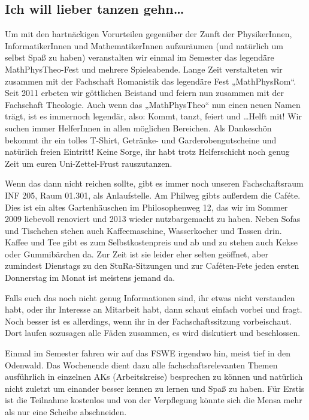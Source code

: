 \subsection*{Ich will lieber tanzen gehn\dots}
Um mit den hartnäckigen Vorurteilen gegenüber der Zunft der PhysikerInnen, InformatikerInnen und MathematikerInnen aufzuräumen (und natürlich um selbst Spaß zu haben) veranstalten wir einmal im Semester das legendäre MathPhysTheo-Fest und mehrere Spieleabende. Lange Zeit verstalteten wir zusammen mit der Fachschaft Romanistik das legendäre Fest „MathPhysRom“. Seit 2011 erbeten wir göttlichen Beistand und feiern nun zusammen mit der Fachschaft Theologie. Auch wenn das „MathPhysTheo“ nun einen neuen Namen trägt, ist es immernoch legendär, also: Kommt, tanzt, feiert und \dots Helft mit! Wir suchen immer HelferInnen in allen möglichen Bereichen. Als Dankeschön bekommt ihr ein tolles T-Shirt, Getränke- und Garderobengutscheine und natürlich freien Eintritt! Keine Sorge, ihr habt trotz Helferschicht noch genug Zeit um euren Uni-Zettel-Frust rauszutanzen.

Wenn das dann nicht reichen sollte, gibt es immer noch unseren Fachschaftsraum INF 205, Raum 01.301, als Anlaufstelle. Am Philweg gibts außerdem die Caféte. Dies ist ein altes Gartenhäuschen im Philosophenweg 12, das wir im Sommer 2009 liebevoll renoviert und 2013 wieder nutzbargemacht zu haben. Neben Sofas und Tischchen stehen auch Kaffeemaschine, Wasserkocher und Tassen drin. Kaffee und Tee gibt es zum Selbstkostenpreis und ab und zu stehen auch Kekse oder Gummibärchen da. Zur Zeit ist sie leider eher selten geöffnet, aber zumindest Dienstags zu den \gls{StuRa}-Sitzungen und zur Caféten-Fete jeden ersten Donnerstag im Monat ist meistens jemand da.

Falls euch das noch nicht genug Informationen sind, ihr etwas nicht verstanden habt, oder ihr Interesse an Mitarbeit habt, dann schaut einfach vorbei und fragt. Noch besser ist es allerdings, wenn ihr in der Fachschaftssitzung vorbeischaut. Dort laufen sozusagen alle Fäden zusammen, es wird diskutiert und beschlossen.

Einmal im Semester fahren wir auf das \gls{FSWE} irgendwo hin, meist tief in den Odenwald. Das Wochenende dient dazu alle fachschaftsrelevanten Themen ausführlich in einzelnen AKs (Arbeitskreise) besprechen zu können und natürlich nicht zuletzt um einander besser kennen zu lernen und Spaß zu haben. Für Erstis ist die Teilnahme kostenlos und von der Verpflegung könnte sich die Mensa mehr als nur eine Scheibe abschneiden.
